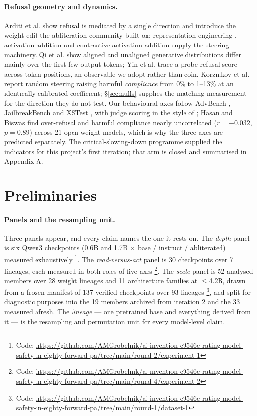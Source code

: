 \documentclass[11pt,letterpaper]{article}
\begin{document}
\paragraph{Refusal geometry and dynamics.} Arditi et al. \citep{Arditi2024} show refusal is mediated by a single direction and introduce the weight edit the abliteration community built on; representation engineering \citep{ZouRepE2023}, activation addition \citep{Turner2023} and contrastive activation addition \citep{Rimsky2024} supply the steering machinery. Qi et al. \citep{Qi2025} show aligned and unaligned generative distributions differ mainly over the first few output tokens; Yin et al. \citep{Yin2025} trace a probe refusal score across token positions, an observable we adopt rather than coin. Korznikov et al. \citep{Korznikov2025} report random steering raising harmful \emph{compliance} from 0\% to 1--13\% at an identically calibrated coefficient; \S\ref{sec:nulls} supplies the matching measurement for the direction they do not test. Our behavioural axes follow AdvBench \citep{Zou2023}, JailbreakBench \citep{Chao2024} and XSTest \citep{Rottger2024}, with judge scoring in the style of \citet{Zheng2023}; Hasan and Biswas \citep{Hasan2026} find over-refusal and harmful compliance nearly uncorrelated ($r = -0.032$, $p = 0.89$) across 21 open-weight models, which is why the three axes are predicted separately. The critical-slowing-down programme \citep{Scheffer2009,Scheffer2012,Dakos2012,Bury2023} supplied the indicators for this project's first iteration; that arm is closed and summarised in Appendix A.

\section{Preliminaries}

\paragraph{Panels and the resampling unit.} Three panels appear, and every claim names the one it rests on. The \emph{depth} panel is six Qwen3 \citep{Yang2025} checkpoints (0.6B and 1.7B $\times$ base / instruct / abliterated) measured exhaustively \footnote{Code: \url{https://github.com/AMGrobelnik/ai-invention-c9546e-rating-model-safety-in-eighty-forward-pa/tree/main/round-2/experiment-1}}. The \emph{read-versus-act} panel is 30 checkpoints over 7 lineages, each measured in both roles of five axes \footnote{Code: \url{https://github.com/AMGrobelnik/ai-invention-c9546e-rating-model-safety-in-eighty-forward-pa/tree/main/round-4/experiment-2}}. The \emph{scale} panel is 52 analysed members over 28 weight lineages and 11 architecture families at $\leq$4.2B, drawn from a frozen manifest of 137 verified checkpoints over 93 lineages \footnote{Code: \url{https://github.com/AMGrobelnik/ai-invention-c9546e-rating-model-safety-in-eighty-forward-pa/tree/main/round-1/dataset-1}}, and split for diagnostic purposes into the 19 members archived from iteration 2 and the 33 measured afresh. The \emph{lineage} --- one pretrained base and everything derived from it --- is the resampling and permutation unit for every model-level claim.
\end{document}
